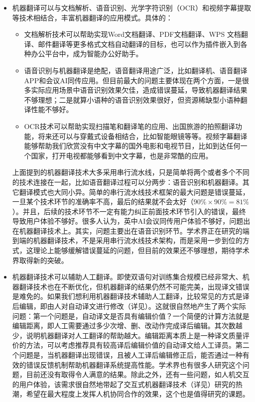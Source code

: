 \begin{spacing}{1.18}
\begin{itemize}
\item 机器翻译可以与文档解析、语音识别、光学字符识别（OCR）和视频字幕提取等技术相结合，丰富机器翻译的应用模式。具体的：
\begin{itemize}
\item 文档解析技术可以帮助实现Word文档翻译、PDF文档翻译、WPS 文档翻译、邮件翻译等更多格式文档自动翻译的目标，也可以作为插件嵌入到各种办公平台中，成为智能办公好助手。

\item 语音识别与机器翻译是绝配，语音翻译用途广泛，比如翻译机、语音翻译APP和会议AI同传应用。但目前最大的问题主要体现在两个方面，一是很多实际应用场景中语音识别效果欠佳，造成错误蔓延，导致机器翻译结果不够理想；二是就算小语种的语音识别效果很好，但资源稀缺型小语种翻译性能不够好。

\item OCR技术可以帮助实现扫描笔和翻译笔的应用、出国旅游的拍照翻译功能，将来还可以与穿戴式设备相结合，比如智能眼镜等等。视频字幕翻译能够帮助我们欣赏没有中文字幕的国外电影和电视节目，比如到达任何一个国家，打开电视都能够看到中文字幕，也是非常酷的应用。
\end{itemize}
上面提到的机器翻译技术大多采用串行流水线，只是简单将两个或者多个不同的技术连接在一起，比如语音翻译过程可以分两步：语音识别和机器翻译。其它翻译模式也大同小异。简单的串行流水线技术框架的最大问题是错误蔓延，一旦某个技术环节的准确率不高，最后的结果就不会太好（$90\% \times 90\%=81\% $）。并且，后续的技术环节不一定有能力纠正前面技术环节引入的错误，最终导致用户体验不够好。很多人认为，英中AI会议同传用户体验不够好，问题出在机器翻译技术上。其实，问题主要出在语音识别环节。学术界正在研究的端到端的机器翻译技术，不是采用串行流水线技术架构，而是采用一步到位的方式，这理论上能够缓解错误蔓延的问题，但目前的效果还不够理想，期待学术界取得新的突破。

\item 机器翻译技术可以辅助人工翻译。即使双语句对训练集合规模已经非常大、机器翻译技术也在不断优化，但机器翻译的结果仍然不可能完美，出现译文错误是难免的。如果我们想利用机器翻译技术辅助人工翻译，比较常见的方式是译后编辑，即由人对自动译文进行修改（详见{\chapterfour}）。这就很自然地产生了两个实际问题：第一个问题是，自动译文是否具有编辑价值？一个简便的计算方法就是编辑距离，即人工需要通过多少次增、删、改动作完成译后编辑。其次数越少，说明机器翻译对人工翻译的帮助越大。编辑距离本质上是一种译文质量评价的方法，可以考虑推荐具有较高译后编辑价值的自动译文给人工译员。第二个问题是，当机器翻译出现错误，且被人工译后编辑修正后，能否通过一种有效的错误反馈机制帮助机器翻译系统提高性能。学术界也有很多人研究这个问题，目前还没有取得令人满意的结果。除此之外，还有一些问题，如人机交互的用户体验，该需求很自然地带起了交互式机器翻译技术（详见{\chaptereighteen}）研究的热潮，希望在最大程度上发挥人机协同合作的效果，这个也是值得研究的课题。
\end{itemize}


\end{spacing}

